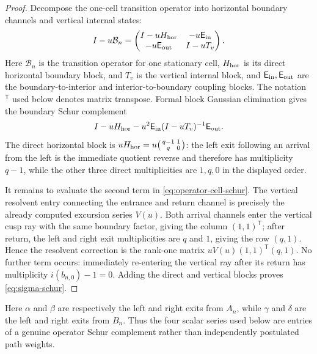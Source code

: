 \documentclass[11pt,reqno]{amsart}
\numberwithin{equation}{section}
\theoremstyle{definition}
\theoremstyle{remark}
\begin{document}
\begin{proof}
Decompose the one-cell transition operator into horizontal boundary channels
and vertical internal states:
\[
 I-u\mathcal B_n=
 \begin{pmatrix}
  I-uH_{\rm hor}&-u\mathsf E_{\rm in}\\
  -u\mathsf E_{\rm out}&I-uT_v
 \end{pmatrix}.
\]
Here $\mathcal B_n$ is the transition operator for one stationary cell,
$H_{\rm hor}$ is its direct horizontal boundary block, and $T_v$ is the
vertical internal block,
and $\mathsf E_{\rm in},\mathsf E_{\rm out}$ are the boundary-to-interior and
interior-to-boundary coupling blocks.  The notation ${}^{\mathsf T}$ used
below denotes matrix transpose.
Formal block Gaussian elimination gives the boundary Schur complement
\begin{equation}\label{eq:operator-cell-schur}
 I-uH_{\rm hor}-u^2\mathsf E_{\rm in}(I-uT_v)^{-1}\mathsf E_{\rm out}.
\end{equation}
The direct horizontal block is
$uH_{\rm hor}=u\bigl(\begin{smallmatrix}q-1&1\\q&0\end{smallmatrix}\bigr)$:
the left exit following an arrival from the left is the immediate quotient
reverse and therefore has multiplicity $q-1$, while the other three direct
multiplicities are $1,q,0$ in the displayed order.

It remains to evaluate the second term in
\eqref{eq:operator-cell-schur}.  The vertical resolvent entry connecting the
entrance and return channel is precisely the already computed excursion
series $V(u)$.  Both arrival channels enter the vertical cusp ray with the same boundary
factor, giving the column $(1,1)^{\mathsf T}$; after return, the left and right
exit multiplicities are $q$ and $1$, giving the row $(q,1)$.  Hence the
resolvent correction is the rank-one matrix
$uV(u)(1,1)^{\mathsf T}(q,1)$.  No further term occurs: immediately re-entering
the vertical ray after its return has multiplicity $i(b_{n,0})-1=0$.  Adding the
direct and vertical blocks proves \eqref{eq:sigma-schur}.
\end{proof}

Here $\alpha$ and $\beta$ are respectively the left and right exits from
$A_n$, while $\gamma$ and $\delta$ are the left and right exits from $B_n$.
Thus the four scalar series used below are entries of a genuine operator Schur
complement rather than independently postulated path weights.
\end{document}
